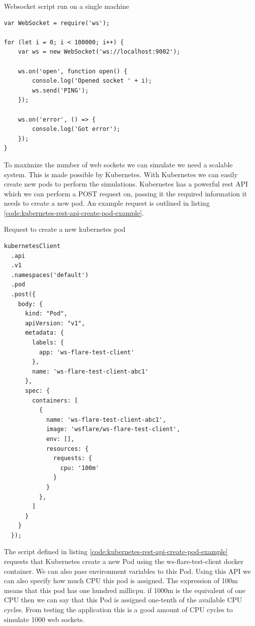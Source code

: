 \begin{listing}[H]
    \caption{Websocket script run on a single machine}
    \label{code:single-machine-websocket-example}
    \begin{verbatim}
var WebSocket = require('ws');

for (let i = 0; i < 100000; i++) {
    var ws = new WebSocket('ws://localhost:9002');

    ws.on('open', function open() {
        console.log('Opened socket ' + i);
        ws.send('PING');
    });

    ws.on('error', () => {
        console.log('Got error');
    });
}
\end{verbatim}
\end{listing}

To maximize the number of web sockets we can simulate we need a scalable system. This is made possible by Kubernetes. With Kubernetes we can easily create new pods to perform the simulations. Kubernetes has a powerful rest API which we can perform a POST request on, passing it the required information it needs to create a new pod. An example request is outlined in listing \ref{code:kubernetes-rest-api-create-pod-example}.

\begin{listing}[H]
    \caption{Request to create a new kubernetes pod}
    \label{code:kubernetes-rest-api-create-pod-example}
\begin{verbatim}
kubernetesClient
  .api
  .v1
  .namespaces('default')
  .pod
  .post({
    body: {
      kind: "Pod",
      apiVersion: "v1",
      metadata: {
        labels: {
          app: 'ws-flare-test-client'
        },
        name: 'ws-flare-test-client-abc1'
      },
      spec: {
        containers: [
          {
            name: 'ws-flare-test-client-abc1',
            image: 'wsflare/ws-flare-test-client',
            env: [],
            resources: {
              requests: {
                cpu: '100m'
              }
            }
          },
        ]
      }
    }
  });
\end{verbatim}
\end{listing}

The script defined in listing \ref{code:kubernetes-rest-api-create-pod-example} requests that Kubernetes create a new Pod using the ws-flare-test-client docker container. We can also pass environment variables to this Pod. Using this API we can also specify how much CPU this pod is assigned. The expression of 100m means that this pod has one hundred millicpu. if 1000m is the equivalent of one CPU then we can say that this Pod is assigned one-tenth of the available CPU cycles. From testing the application this is a good amount of CPU cycles to simulate 1000 web sockets. 

